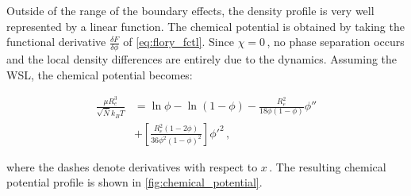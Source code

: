 \documentclass[bachelor,       %
               oneside,        %
               BCOR10mm,       %
               ngerman, english %
               ]{GAUBM}
\begin{document}
Outside of the range of the boundary effects, the density profile is very well represented by a linear function. The chemical potential is obtained by taking the functional derivative $\frac{\delta F}{\delta\phi}$ of \autoref{eq:flory_fctl}. Since $\chi=0\,$, no phase separation occurs and the local density differences are entirely due to the dynamics. Assuming the WSL, the chemical potential becomes:


\begin{align}
  \frac{\mu R_e^3}{\sqrt{\bar N} k_BT}&=\ln\phi-\ln(1-\phi)-\frac{R_e^2}{18\phi(1-\phi)}\phi''\nonumber \\ &+\left[\frac{R_e^2(1-2\phi)}{36\phi^2(1-\phi)^2}\right]\phi'^2\,,
  \label{eq:mu_flory}
\end{align}

where the dashes denote derivatives with respect to $x\,.$ The resulting chemical potential profile is shown in \autoref{fig:chemical_potential}.
\end{document}
